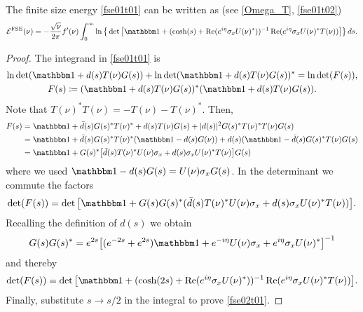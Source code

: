 \begin{lemma}\label{fse02t}
The finite size energy \eqref{fse01t01} can be written as (see \eqref{Omega_T}, \eqref{fse01t02})
\begin{equation}\label{fse02t01}
   \mathcal{E}^{\text{FSE}}(\nu)
     = -\frac{\sqrt{\nu}}{2\pi}f'(\nu) \int_0^\infty 
          \ln\big\{\det\big[ \id + ( \cosh(s) + \re(e^{i\eta}\sigma_xU(\nu)^*) )^{-1}\re(e^{i\eta}\sigma_xU(\nu)^*T(\nu)) \big]\big\} \, ds .
\end{equation}
\end{lemma}
\begin{proof}
The integrand in \eqref{fse01t01} is
\begin{gather*}
  \ln\det(\id + d(s) T(\nu) G(s)) + \ln\det(\id + d(s) T(\nu) G(s))^*  
     = \ln\det(F(s)),\\
  F(s) \coloneqq (\id+d(s)T(\nu)G(s))^*(\id+d(s)T(\nu)G(s)) .
\end{gather*}
Note that $T(\nu)^*T(\nu)=-T(\nu)-T(\nu)^*$. Then,
\begin{equation*}
\begin{split}
  F(s) 
   & = \id + \bar d(s) G(s)^*T(\nu)^* + d(s) T(\nu)G(s) + |d(s)|^2 G(s)^*T(\nu)^*T(\nu)G(s) \\
   & = \id + \bar d(s) G(s)^*T(\nu)^*(\id-d(s)G(\nu)) + d(s)(\id-\bar d(s)G(s)^*T(\nu)G(s) \\
   & = \id + G(s)^*\big[ \bar d(s)T(\nu)^*U(\nu)\sigma_x + d(s) \sigma_xU(\nu)^*T(\nu) \big]G(s)
\end{split}
\end{equation*}
where we used $\id-d(s)G(s)= U(\nu)\sigma_xG(s)$. In the determinant we commute the factors
\begin{equation*}
  \det(F(s))
    = \det\big[ \id + G(s)G(s)^*( \bar d(s)T(\nu)^*U(\nu)\sigma_x + d(s) \sigma_xU(\nu)^*T(\nu) ) \big] .
\end{equation*}
Recalling the definition of $d(s)$ we obtain
\begin{equation*}
  G(s)G(s)^* 
   = e^{2s} \big[ (e^{-2s} + e^{2s})\id + e^{-i\eta}U(\nu)\sigma_x + e^{i\eta}\sigma_xU(\nu)^* \big]^{-1}
\end{equation*}
and thereby
\begin{equation*}
  \det(F(s))
   =  \det\big[ \id + ( \cosh(2s) + \re(e^{i\eta}\sigma_xU(\nu)^*) )^{-1}\re(e^{i\eta}\sigma_xU(\nu)^*T(\nu)) \big] .
\end{equation*}
Finally, substitute $s\to s/2$ in the integral to prove \eqref{fse02t01}.
\end{proof}

